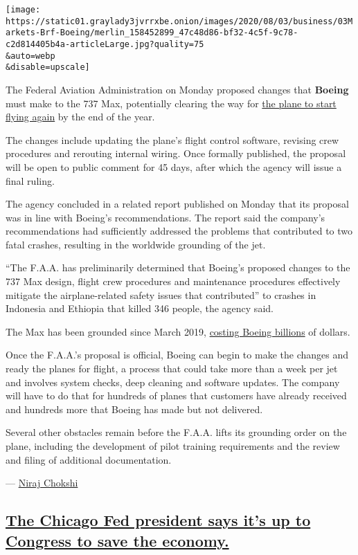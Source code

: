 \texttt{[image: https://static01.graylady3jvrrxbe.onion/images/2020/08/03/business/03Markets-Brf-Boeing/merlin\_158452899\_47c48d86-bf32-4c5f-9c78-c2d814405b4a-articleLarge.jpg?quality=75\\\&auto=webp\\\&disable=upscale]}

The Federal Aviation Administration on Monday proposed changes that
\textbf{Boeing} must make to the 737 Max, potentially clearing the way
for
\href{https://www.nytimes3xbfgragh.onion/2020/07/15/business/boeing-737-max-return.html}{the
plane to start flying again} by the end of the year.

The changes include updating the plane's flight control software,
revising crew procedures and rerouting internal wiring. Once formally
published, the proposal will be open to public comment for 45 days,
after which the agency will issue a final ruling.

The agency concluded in a related report published on Monday that its
proposal was in line with Boeing's recommendations. The report said the
company's recommendations had sufficiently addressed the problems that
contributed to two fatal crashes, resulting in the worldwide grounding
of the jet.

``The F.A.A. has preliminarily determined that Boeing's proposed changes
to the 737 Max design, flight crew procedures and maintenance procedures
effectively mitigate the airplane-related safety issues that
contributed'' to crashes in Indonesia and Ethiopia that killed 346
people, the agency said.

The Max has been grounded since March 2019,
\href{https://www.nytimes3xbfgragh.onion/2020/01/29/business/boeing-737-max-costs.html}{costing
Boeing billions} of dollars.

Once the F.A.A.'s proposal is official, Boeing can begin to make the
changes and ready the planes for flight, a process that could take more
than a week per jet and involves system checks, deep cleaning and
software updates. The company will have to do that for hundreds of
planes that customers have already received and hundreds more that
Boeing has made but not delivered.

Several other obstacles remain before the F.A.A. lifts its grounding
order on the plane, including the development of pilot training
requirements and the review and filing of additional documentation.

--- \href{https://www.nytimes3xbfgragh.onion/by/niraj-chokshi}{Niraj
Chokshi}

\hypertarget{the-chicago-fed-president-says-its-up-to-congress-to-save-the-economy}{%
\subsection{\texorpdfstring{\protect\hyperlink{the-chicago-fed-president-says-its-up-to-congress-to-save-the-economy}{The
Chicago Fed president says it's up to Congress to save the
economy.}}{The Chicago Fed president says it's up to Congress to save the economy.}}\label{the-chicago-fed-president-says-its-up-to-congress-to-save-the-economy}}

